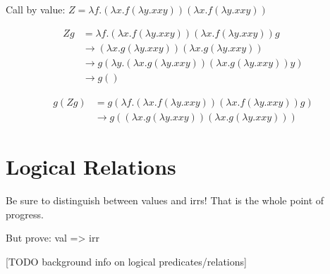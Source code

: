 \documentclass[a4paper, 11pt, article, danish, oneside]{memoir}
\DeclarePairedDelimiter{\auxdelimbbracket}{\llbracket}{\rrbracket}
\newcommand{\step}{\to}
\renewcommand{\prod}{\times}
\newcommand{\objlang}[1]{{\normalfont\textsf{\textcolor{objlangcolor}{#1}}}}
\newcommand{\objOp}[1]{\operatorname{\objlang{#1}}}
\newcommand{\objDelim}[1]{\objlang{(}#1\objlang{)}}
\newcommand{\objInl}[1]{\textcolor{objlangcolor}{\iota_1}\,#1}
\newcommand{\objInr}[1]{\textcolor{objlangcolor}{\iota_2}\,#1}
\newcommand{\objUnit}{\objlang{()}}
\newcommand{\objRec}[3]{\objOp{rec}#1\objDelim{#2} \mathrel{\textcolor{objlangcolor}{\ensuremath{\coloneqq}}} #3}
\newcommand{\objApp}[2]{#1\,#2}
\newcommand{\objMatch}[4]{\objlang{match} \;#1\, \objlang{with}\: \objInl{#2} \mathbin{\textcolor{objlangcolor}{\Rightarrow}} #3 \mathbin{\textcolor{objlangcolor}{\mid}} \objInr{#2} \mathbin{\textcolor{objlangcolor}{\Rightarrow}} #4 \,\objlang{end}} %
\begin{document}
Call by value: $Z = \lambda f . (\lambda x . f (\lambda y. x x y)) (\lambda x. f (\lambda y. x x y))$

\begin{align*}
    Z g
        &= \lambda f . (\lambda x . f (\lambda y. x x y)) (\lambda x. f (\lambda y. x x y)) g \\
        &\step (\lambda x . g (\lambda y. x x y)) (\lambda x. g (\lambda y. x x y)) \\
        &\step g (\lambda y. (\lambda x. g (\lambda y. x x y)) (\lambda x. g (\lambda y. x x y)) y) \\
        &\step g (  )
\end{align*}

\begin{align*}
    g (Z g)
        &= g (\lambda f . (\lambda x . f (\lambda y. x x y)) (\lambda x. f (\lambda y. x x y)) g) \\
        &\step g ((\lambda x . g (\lambda y. x x y)) (\lambda x. g (\lambda y. x x y)))
\end{align*}


\chapter{Logical Relations}

Be sure to distinguish between values and irrs! That is the whole point of progress.

But prove: val => irr

[TODO background info on logical predicates/relations]


\renewcommand{\objRec}[3]{\objlang{\ensuremath{\lambda}}#2\objlang{.}#3}
\renewcommand{\objUnit}{\textcolor{objlangcolor}{1}}



\newcommand{\syntype}[3]{#1 \vdash #2 : #3}
\newcommand{\semtype}[3]{#1 \vDash #2 : #3}
\newcommand{\recTODO}{f}
\newcommand{\typeFunc}[2]{#1 \to #2}
\newcommand{\typeProd}[2]{#1 \prod #2}
\newcommand{\typeSum}[2]{#1 + #2}

\newcommand{\expInt}[1]{\calE\auxdelimbbracket{#1}}
\newcommand{\valInt}[1]{\calV\auxdelimbbracket{#1}}
\newcommand{\envInt}[1]{\calG\auxdelimbbracket{#1}}

\newcommand{\setCVal}{\mathit{CVal}}

\renewcommand{\objMatch}[4]{\objlang{match}(#1;#2.#3;#2.#4)}
\newcommand{\objProj}[2]{\textcolor{objlangcolor}{\pi_{#1}}\,#2} %
\newcommand{\objInj}[2]{\textcolor{objlangcolor}{\iota_{#1}}\,#2} %
\end{document}
